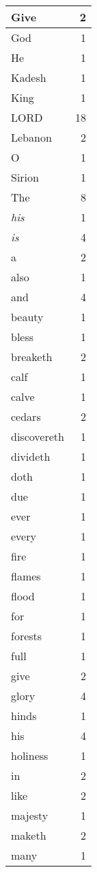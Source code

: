 \begin{center}
\begin{longtable}{l|r}
\hline \hline
\endlastfoot
Give & 2 \\ \hline
God & 1 \\ \hline
He & 1 \\ \hline
Kadesh & 1 \\ \hline
King & 1 \\ \hline
LORD & 18 \\ \hline
Lebanon & 2 \\ \hline
O & 1 \\ \hline
Sirion & 1 \\ \hline
The & 8 \\ \hline
\emph{his} & 1 \\ \hline
\emph{is} & 4 \\ \hline
a & 2 \\ \hline
also & 1 \\ \hline
and & 4 \\ \hline
beauty & 1 \\ \hline
bless & 1 \\ \hline
breaketh & 2 \\ \hline
calf & 1 \\ \hline
calve & 1 \\ \hline
cedars & 2 \\ \hline
discovereth & 1 \\ \hline
divideth & 1 \\ \hline
doth & 1 \\ \hline
due & 1 \\ \hline
ever & 1 \\ \hline
every & 1 \\ \hline
fire & 1 \\ \hline
flames & 1 \\ \hline
flood & 1 \\ \hline
for & 1 \\ \hline
forests & 1 \\ \hline
full & 1 \\ \hline
give & 2 \\ \hline
glory & 4 \\ \hline
hinds & 1 \\ \hline
his & 4 \\ \hline
holiness & 1 \\ \hline
in & 2 \\ \hline
like & 2 \\ \hline
majesty & 1 \\ \hline
maketh & 2 \\ \hline
many & 1 \\ \hline

\end{longtable}
\end{center}
